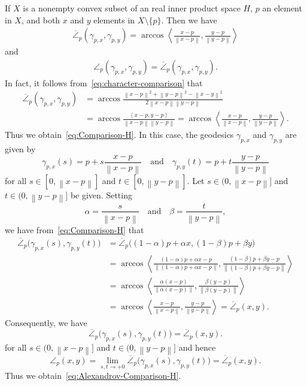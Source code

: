 \documentclass[draft]{amsart}
\numberwithin{equation}{section}
\providecommand{\norm}[1]{\left\lVert#1\right\rVert}
\newcommand{\ip}[2]{\left\langle #1, #2 \right\rangle}
\theoremstyle{plain}
\theoremstyle{definition}
\theoremstyle{remark}
\begin{document}
If $X$ is a nonempty convex subset of an real inner product space $H$, 
$p$ an element in $X$, and both $x$ and $y$ elements in 
$X\setminus \{p\}$. Then we have 
\begin{align}\label{eq:Comparison-H}
 \overline{\angle}_p(\gamma_{p, x}, \gamma_{p, y})
 = \arccos 
 \ip{\frac{x-p}{\norm{x-p}}}{\frac{y-p}{\norm{y-p}}}
\end{align}
and 
\begin{align}\label{eq:Alexandrov-Comparison-H}
 \angle_{p}(\gamma_{p, x}, \gamma_{p, y})
 =\overline{\angle}_p(\gamma_{p, x}, \gamma_{p, y}). 
\end{align}
In fact, it follows from~\eqref{eq:character-comparison} that 
\begin{align*}
 \overline{\angle}_p (\gamma_{p, x}, \gamma_{p, y}) 
 &= \arccos \frac{\norm{x-p}^2 + \norm{y-p}^2 - \norm{x-y}^2}
 {2\norm{x-p}\norm{y-p}} \\ 
 &= \arccos \frac{\ip{x-p}{y-p}}
 {\norm{x-p}\norm{y-p}} 
 = \arccos \ip{\frac{x-p}{\norm{x-p}}}
 {\frac{y-p}{\norm{y-p}}}. 
\end{align*}
Thus we obtain~\eqref{eq:Comparison-H}. 
In this case, the geodesics $\gamma_{p, x}$ and $\gamma_{p, y}$ 
are given by 
\[
 \gamma_{p, x}(s) = p + s\frac{x-p}{\norm{x-p}} 
 \quad \textrm{and} \quad
 \gamma_{p, y}(t) = p + t\frac{y-p}{\norm{y-p}} 
\]
for all $s\in [0,\norm{x-p}]$ and $t\in [0,\norm{y-p}]$. 
Let $s\in (0, \norm{x-p}]$ and $t\in (0,\norm{y-p}]$ be given. 
Setting 
\[
 \alpha = \frac{s}{\norm{x-p}} 
 \quad \textrm{and} \quad 
 \beta = \frac{t}{\norm{y-p}}, 
\]
we have from~\eqref{eq:Comparison-H} that 
\begin{align*}
 \overline{\angle}_p\bigl(\gamma_{p, x}(s), \gamma_{p, y}(t)\bigr) 
 &=\overline{\angle}_p
  \bigl((1-\alpha)p + \alpha x, (1-\beta)p + \beta y\bigr) \\
 &= \arccos 
 \ip{
 \frac{(1-\alpha)p + \alpha x -p}{\norm{(1-\alpha)p + \alpha x -p}}
 }
 {
 \frac{(1-\beta)p + \beta y -p}{\norm{(1-\beta)p + \beta y -p}}
 } \\
 &= \arccos 
 \ip{
 \frac{\alpha (x-p)}{\norm{\alpha (x-p)}}
 }
 {
 \frac{\beta (y-p)}{\norm{\beta (y-p)}}
 } \\
 &= \arccos 
 \ip{
 \frac{x-p}{\norm{x-p}}
 }
 {
 \frac{y-p}{\norm{y-p}}
 } = \overline{\angle}_p(x,y). 
\end{align*}
Consequently, we have 
\[
 \overline{\angle}_p\bigl(\gamma_{p, x}(s), \gamma_{p, y}(t)\bigr) 
 =\overline{\angle}_p(x,y). 
\]
for all $s\in (0,\norm{x-p}]$ and $t\in (0,\norm{y-p}]$ 
and hence 
\[
 \angle_p(x, y)
 = \lim_{s, t\to +0} 
  \overline{\angle}_p\bigl(\gamma_{p, x}(s), \gamma_{p, y}(t)\bigr) 
 = \overline{\angle}_p(x,y). 
\]
Thus we obtain~\eqref{eq:Alexandrov-Comparison-H}. 
\end{document}
